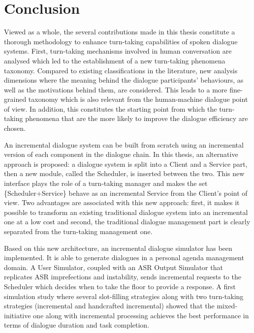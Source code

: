 \chapter*{Conclusion}

	Viewed as a whole, the several contributions made in this thesis constitute a thorough methodology to enhance turn-taking capabilities of spoken dialogue systems. First, turn-taking mechanisms involved in human conversation are analysed which led to the establishment of a new turn-taking phenomena taxonomy. Compared to existing classifications in the literature, new analysis dimensions where the meaning behind the dialogue participants' behaviours, as well as the motivations behind them, are considered. This leads to a more fine-grained taxonomy which is also relevant from the human-machine dialogue point of view. In addition, this constitutes the starting point from which the turn-taking phenomena that are the more likely to improve the dialogue efficiency are chosen.

        An incremental dialogue system can be built from scratch using an incremental version of each component in the dialogue chain. In this thesis, an alternative approach is proposed: a dialogue system is split into a Client and a Service part, then a new module, called the Scheduler, is inserted between the two. This new interface plays the role of a turn-taking manager and makes the set \{Scheduler+Service\} behave as an incremental Service from the Client's point of view. Two advantages are associated with this new approach: first, it makes it possible to transform an existing traditional dialogue system into an incremental one at a low cost and second, the traditional dialogue management part is clearly separated from the turn-taking management one.

        Based on this new architecture, an incremental dialogue simulator has been implemented. It is able to generate dialogues in a personal agenda management domain. A User Simulator, coupled with an ASR Output Simulator that replicates ASR imprefections and instability, sends incremental requests to the Scheduler which decides when to take the floor to provide a response. A first simulation study where several slot-filling strategies along with two turn-taking strategies (incremental and handcrafted incremental) showed that the mixed-initiative one along with incremental processing achieves the best performance in terms of dialogue duration and task completion.

